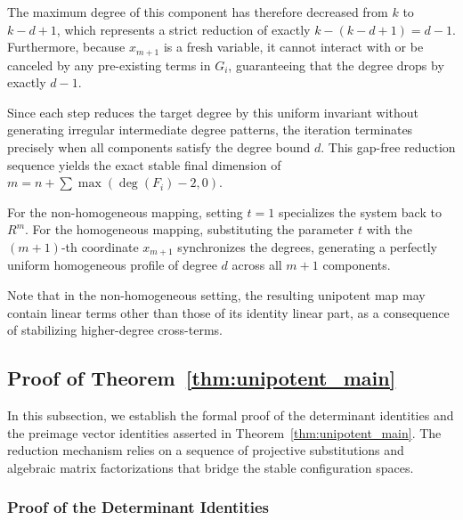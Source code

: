 \documentclass[11pt,a4paper]{article}
\begin{document}
The maximum degree of this component has therefore decreased from $k$ to $k - d + 1$, which represents a strict reduction of exactly $k - (k - d + 1) = d - 1$. Furthermore, because $x_{m+1}$ is a fresh variable, it cannot interact with or be canceled by any pre-existing terms in $G_i$, guaranteeing that the degree drops by exactly $d-1$. 

Since each step reduces the target degree by this uniform invariant without generating irregular intermediate degree patterns, the iteration terminates precisely when all components satisfy the degree bound $d$. This gap-free reduction sequence yields the exact stable final dimension of $m = n + \sum \max(\deg(F_i) - 2, 0)$.

For the non-homogeneous mapping, setting $t=1$ specializes the system back to $R^m$. For the homogeneous mapping, substituting the parameter $t$ with the $(m+1)$-th coordinate $x_{m+1}$ synchronizes the degrees, generating a perfectly uniform homogeneous profile of degree $d$ across all $m+1$ components. 

Note that in the non-homogeneous setting, the resulting unipotent map may contain linear terms other than those of its identity linear part, as a consequence of stabilizing higher-degree cross-terms.

\subsection{Proof of Theorem~\ref{thm:unipotent_main}}
\label{subsec:proof_unipotent_main}

In this subsection, we establish the formal proof of the determinant identities and the preimage vector identities asserted in Theorem~\ref{thm:unipotent_main}. The reduction mechanism relies on a sequence of projective substitutions and algebraic matrix factorizations that bridge the stable configuration spaces.

\subsubsection{Proof of the Determinant Identities}
\end{document}
